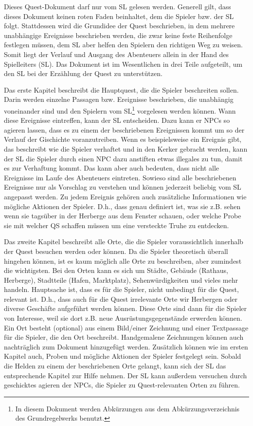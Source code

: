 Dieses Quest-Dokument darf nur vom SL gelesen werden. Generell gilt, dass dieses Dokument keinen roten Faden beinhaltet, dem die Spieler bzw. der SL folgt. Stattdessen wird die Grundidee der Quest beschrieben, in dem mehrere unabhängige Ereignisse beschrieben werden, die zwar keine feste Reihenfolge festlegen müssen, dem SL aber helfen den Spielern den richtigen Weg zu weisen. Somit liegt der Verlauf und Ausgang des Abenteuers allein in der Hand des Spielleiters (SL). Das Dokument ist im Wesentlichen in drei Teile aufgeteilt, um den SL bei der Erzählung der Quest zu unterstützen.

Das erste Kapitel beschreibt die Hauptquest, die die Spieler beschreiten sollen. Darin werden einzelne Passagen bzw. Ereignisse beschrieben, die unabhängig voneinander sind und den Spielern vom SL\footnote{In diesem Dokument werden Abkürzungen aus dem Abkürzungsverzeichnis des Grundregelwerks benutzt.} vorgelesen werden können. Wann diese Ereignisse eintreffen, kann der SL entscheiden. Dazu kann er NPCs so agieren lassen, dass es zu einem der beschriebenen Ereignissen kommt um so der Verlauf der Gischichte voranzutreiben. Wenn es beispielsweise ein Ereignis gibt, das beschreibt wie die Spieler verhaftet und in den Kerker gebracht werden, kann der SL die Spieler durch einen NPC dazu anstiften etwas illegales zu tun, damit es zur Verhaftung kommt. Das kann aber auch bedeuten, dass nicht alle Ereignisse im Laufe des Abenteuers eintreten. Sowieso sind alle beschriebenen Ereignisse nur als Vorschlag zu verstehen und können jederzeit beliebig vom SL angepasst werden. Zu jedem Ereignis gehören auch zusätzliche Informationen wie mögliche Aktionen der Spieler. D.h., dass genau definiert ist, was sie z.B. sehen wenn sie tagsüber in der Herberge aus dem Fenster schauen, oder welche Probe sie mit welcher QS schaffen müssen um eine versteckte Truhe zu entdecken.

Das zweite Kapitel beschreibt alle Orte, die die Spieler voraussichtlich innerhalb der Quest besuchen werden oder können. Da die Spieler theoretisch überall hingehen können, ist es kaum möglich alle Orte zu beschreiben, aber zumindest die wichtigsten. Bei den Orten kann es sich um Städte, Gebäude (Rathaus, Herberge), Stadtteile (Hafen, Marktplatz), Sehenwürdigkeiten und vieles mehr handeln. Hauptsache ist, dass es für die Spieler, nicht unbedingt für die Quest, relevant ist. D.h., dass auch für die Quest irrelevante Orte wir Herbergen oder diverse Geschäfte aufgeführt werden können. Diese Orte sind dann für die Spieler von Interesse, weil sie dort z.B. neue Ausrüstungsgegenstände erwerden können. Ein Ort besteht (optional) aus einem Bild/einer Zeichnung und einer Textpassage für die Spieler, die den Ort beschreibt. Handgemalene Zeichnungen können auch nachträglich zum Dokument hinzugefügt werden. Zusätzlich können wie im ersten Kapitel auch, Proben und mögliche Aktionen der Spieler festgelegt sein. Sobald die Helden zu einem der beschriebenen Orte gelangt, kann sich der SL das entsprechende Kapitel zur Hilfe nehmen. Der SL kann außerdem versuchen durch geschicktes agieren der NPCs, die Spieler zu Quest-relevanten Orten zu führen. 

